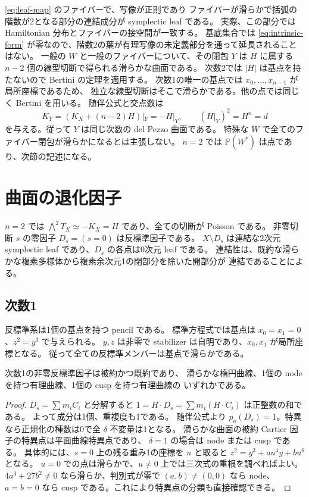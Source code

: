 \eqref{eq:leaf-map} のファイバーで、写像が正則であり
ファイバーが滑らかで括弧の階数が2となる部分の連結成分が symplectic leaf である。
実際、この部分では Hamiltonian 分布とファイバーの接空間が一致する。
基底集合では \eqref{eq:intrinsic-form} が零なので、階数2の葉が有理写像の未定義部分を通って延長されることはない。
一般の $W$ と一般のファイバーについて、その閉包 $Y$ は
$H$ に属する $n-2$ 個の線型切断で得られる滑らかな曲面である。
次数2では $|H|$ は基点を持たないので Bertini の定理を適用する。
次数1の唯一の基点では $x_0,\ldots,x_{n-1}$ が局所座標であるため、
独立な線型切断はそこで滑らかである。他の点では同じく Bertini を用いる。
随伴公式と交点数は
\[
 K_Y=(K_X+(n-2)H)|_Y=-H|_Y,\qquad (H|_Y)^2=H^n=d
\]
を与える。従って $Y$ は同じ次数の del Pezzo 曲面である。
特殊な $W$ で全てのファイバー閉包が滑らかになるとは主張しない。
$n=2$ では $\mathbb P(W^*)$ は点であり、次節の記述になる。

\section{曲面の退化因子}
\label{sec:surfaces}
$n=2$ では $\bigwedge^2T_X\simeq-K_X=H$ であり、全ての切断が Poisson である。
非零切断 $s$ の零因子 $D_s=(s=0)$ は反標準因子である。
$X\setminus D_s$ は連結な2次元 symplectic leaf であり、$D_s$ の各点は0次元 leaf である。
連結性は、既約な滑らかな複素多様体から複素余次元1の閉部分を除いた開部分が
連結であることによる。

\subsection{次数1}
反標準系は1個の基点を持つ pencil である。
標準方程式では基点は $x_0=x_1=0$、$z^2=y^3$ で与えられる。
$y,z$ は非零で stabilizer は自明であり、$x_0,x_1$ が局所座標となる。
従って全ての反標準メンバーは基点で滑らかである。

\begin{proposition}
次数1の非零反標準因子は被約かつ既約であり、
滑らかな楕円曲線、1個の node を持つ有理曲線、1個の cusp を持つ有理曲線の
いずれかである。
\end{proposition}
\begin{proof}
$D_s=\sum m_iC_i$ と分解すると
$1=H\cdot D_s=\sum m_i(H\cdot C_i)$ は正整数の和である。
よって成分は1個、重複度も1である。
随伴公式より $p_a(D_s)=1$。特異なら正規化の種数は0で全 $\delta$ 不変量は1となる。
滑らかな曲面の被約 Cartier 因子の特異点は平面曲線特異点であり、
$\delta=1$ の場合は node または cusp である。
具体的には、$s=0$ 上の残る重み1の座標を $u$ と取ると
$z^2=y^3+au^4y+bu^6$ となる。
$u=0$ での点は滑らかで、$u\neq0$ 上では三次式の重根を調べればよい。
$4a^3+27b^2\neq0$ なら滑らか、判別式が零で $(a,b)\neq(0,0)$ なら node、
$a=b=0$ なら cusp である。これにより特異点の分類も直接確認できる。
\end{proof}

